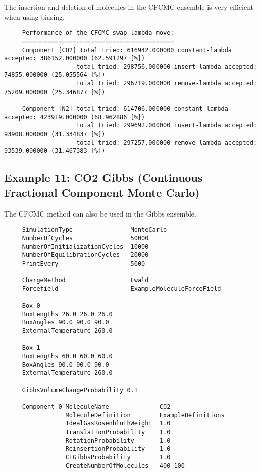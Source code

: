 \indent
The insertion and deletion of molecules in the CFCMC ensemble is very efficient when using biasing.
\begin{tiny}
\begin{verbatim}
     Performance of the CFCMC swap lambda move:
     ==========================================
     Component [CO2] total tried: 616942.000000 constant-lambda accepted: 386152.000000 (62.591297 [%])
                    total tried: 298756.000000 insert-lambda accepted: 74855.000000 (25.055564 [%])
                    total tried: 296719.000000 remove-lambda accepted: 75209.000000 (25.346877 [%])

     Component [N2] total tried: 614706.000000 constant-lambda accepted: 423919.000000 (68.962886 [%])
                    total tried: 299692.000000 insert-lambda accepted: 93908.000000 (31.334837 [%])
                    total tried: 297257.000000 remove-lambda accepted: 93539.000000 (31.467383 [%])
\end{verbatim}
\end{tiny}

\subsection*{Example 11: CO2 Gibbs (Continuous Fractional Component Monte Carlo)}

The CFCMC method can also be used in the Gibbs ensemble.
\begin{tiny}
\begin{verbatim}
     SimulationType                MonteCarlo
     NumberOfCycles                50000
     NumberOfInitializationCycles  10000
     NumberOfEquilibrationCycles   20000
     PrintEvery                    5000

     ChargeMethod                  Ewald
     Forcefield                    ExampleMoleculeForceField

     Box 0
     BoxLengths 26.0 26.0 26.0
     BoxAngles 90.0 90.0 90.0
     ExternalTemperature 260.0

     Box 1
     BoxLengths 60.0 60.0 60.0
     BoxAngles 90.0 90.0 90.0
     ExternalTemperature 260.0

     GibbsVolumeChangeProbability 0.1

     Component 0 MoleculeName              CO2
                 MoleculeDefinition        ExampleDefinitions
                 IdealGasRosenbluthWeight  1.0
                 TranslationProbability    1.0
                 RotationProbability       1.0
                 ReinsertionProbability    1.0
                 CFGibbsProbability        1.0
                 CreateNumberOfMolecules   400 100
\end{verbatim}
\end{tiny}


